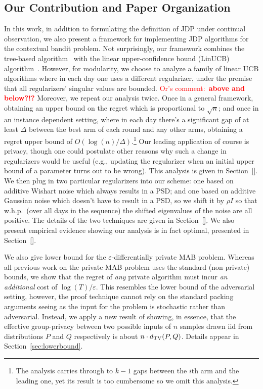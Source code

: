 \documentclass{article}
\newcommand{\os}[1]{\textcolor{red}{Or's comment:~\textbf{#1}}}
\begin{document}
\subsection{Our Contribution and Paper Organization}
\label{subsec:contributions}

In this work, in addition to formulating the definition of JDP under
continual observation, we also present a framework for implementing
JDP algorithms for the contextual bandit problem. Not surprisingly,
our framework combines the tree-based algorithm~\cite{DworkContinualObservation2010}  with the linear
upper-confidence bound (LinUCB) algorithm~\cite{???????}.  However, for modularity,
we choose to analyze a family of linear UCB algorithms where in each
day one uses a different regularizer, under the premise that all
regularizers' singular values are bounded. \os{above and below?!?}
Moreover, we repeat our analysis twice. Once in a general framework,
obtaining an upper bound on the regret which is proportional to
$\sqrt n$; and once in an instance dependent setting, where in each
day there's a significant gap of at least $\Delta$ between the best arm of each round and any other
arms, obtaining a regret upper bound of $O(\log(n)/\Delta)$.\footnote{The analysis carries through to $k-1$ gaps between the $i$th
arm and the leading one, yet its result is too cumbersome so we omit
this analysis.} Our leading application of course is privacy, though
one could postulate other reasons why such a change in regularizers
would be useful (e.g., updating the regularizer when an initial upper
bound of a parameter turns out to be wrong). This analysis is given in Section~\ref{}. We then plug in two
particular regularizers into our scheme: one based on additive Wishart
noise \citep{SheffetPrivateApproxRegression2015} which always results
in a PSD; and one based on additive Gaussian
noise \citep{DworkAnalyzeGauss2014} which doesn't have to result in a PSD, so
we shift it by $\rho I$ so that w.h.p.\ (over all days in the sequence)
the shifted eigenvalues of the noise are all positive. The details of the two techniques are given in Section~\ref{}. We also present
empirical evidence showing our analysis is in fact optimal, presented in Section~\ref{}.

We also give lower bound for the $\varepsilon$-differentially private
MAB problem. Whereas all previous work on the private MAB problem uses
the standard (non-private) bounds, we show that the regret of
\emph{any} private algorithm must incur \emph{an additional} cost of
$\log(T)/\varepsilon$. This resembles the lower bound of the
adversarial setting, however, the proof technique cannot rely on the
standard packing arguments \citep[see, for
example,][]{HardtTalwarGeometryDP2010} seeing as the input for the
problem is stochastic rather than adversarial.  Instead, we apply a
new result of \citet{KarwaVadhanFiniteSampleDP2017} showing, in essence,
that the effective group-privacy between two possible inputs of $n$
samples drawn iid from distributions $P$ and $Q$ respectively is about
$n\cdot d_{\rm TV}(P,Q)$. Details appear in Section~\ref{sec:lowerbound}.
\end{document}
